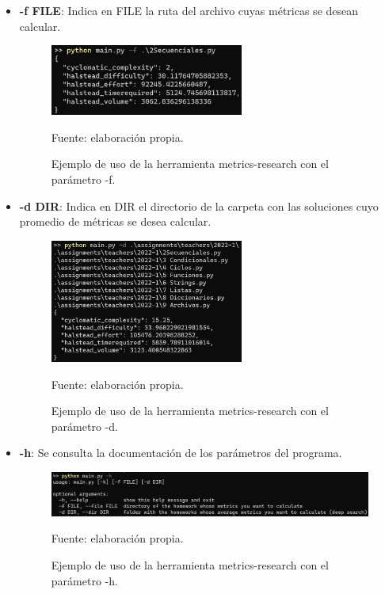 \documentclass[letterpaper,12pt]{article}
\begin{document}
\begin{itemize}
  \item \textbf{-f FILE}: Indica en FILE la ruta del archivo cuyas métricas se desean calcular.
        \begin{figure}[H]
          \centering
          \includegraphics[width=0.6\textwidth]{figures/metricstool1.png}
          \caption{Ejemplo de uso de la herramienta metrics-research con el parámetro -f.} Fuente: elaboración propia.
          \label{metricstool1}
        \end{figure}
  \item \textbf{-d DIR}: Indica en DIR el directorio de la carpeta con las soluciones cuyo promedio de métricas se desea calcular.
        \begin{figure}[H]
          \centering
          \includegraphics[width=0.6\textwidth]{figures/metricstool2.png}
          \caption{Ejemplo de uso de la herramienta metrics-research con el parámetro -d.} Fuente: elaboración propia.
          \label{metricstool2}
        \end{figure}
  \item \textbf{-h}: Se consulta la documentación de los parámetros del programa.
        \begin{figure}[H]
          \centering
          \includegraphics[width=1\textwidth]{figures/metricstool3.png}
          \caption{Ejemplo de uso de la herramienta metrics-research con el parámetro -h.} Fuente: elaboración propia.
          \label{metricstool3}
        \end{figure}
\end{itemize}
\end{document}
